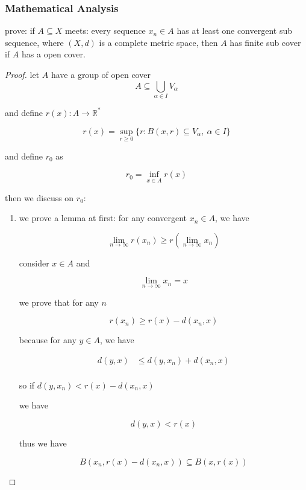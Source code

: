 \subsubsection{Mathematical Analysis}

\begin{exercise}
    prove: if $A \subseteq X$ meets: every sequence $x_n \in A$ has at least one convergent sub sequence, where $(X,d)$ is a complete metric space, then $A$ has finite sub cover 
    if $A$ has a open cover.
\end{exercise}

\begin{proof}
    let $A$ have a group of open cover
    \[
        A \subseteq \bigcup_{\alpha \in I}V_{\alpha}
    \]

    and define $r(x): A \to \mathbb{R}^*$

    \[
        r(x) = \sup_{r \ge 0} \{ r: B(x,r) \subseteq V_{\alpha},\: \alpha \in I \}
    \]

    and define $r_0$ as

    \[
        r_0 = \inf_{x \in A} r(x)
    \]

    then we discuss on $r_0$:

    \begin{enumerate}
        \item we prove a lemma at first: for any convergent $x_n \in A$, we have

        \[
            \lim_{n \to \infty}r(x_n) \ge r(\lim_{n \to \infty}x_n)
        \]

        consider $x \in A$ and

        \[
            \lim_{n \to \infty}x_n = x
        \]

        we prove that for any $n$

        \[
            r(x_n) \ge r(x) - d(x_n, x)
        \]

        because for any $y \in A$, we have

        \begin{align*}
             d(y, x) &\le d(y,x_n) + d(x_n, x) \\
        \end{align*}

        so if $d(y, x_n) < r(x) - d(x_n, x)$

        we have

        \[
            d(y,x) < r(x)
        \]

        thus we have

        \[
            B(x_n, r(x)- d(x_n, x)) \subseteq B(x, r(x))
        \]


\end{enumerate}
\end{proof}
